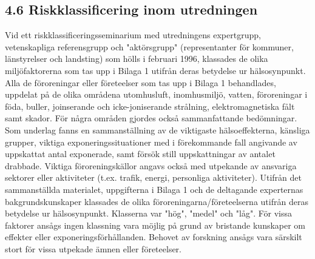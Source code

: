 \subsection*{4.6 Riskklassificering inom utredningen}
Vid ett riskklassificeringsseminarium med utredningens expertgrupp, vetenskapliga referensgrupp och "aktörsgrupp" (representanter för kommuner, länstyrelser och landsting) som hölls i februari 1996, klassades de olika miljöfaktorerna som tas upp i Bilaga 1 utifrån deras betydelse ur hälsosynpunkt.
Alla de föroreningar eller företeelser som tas upp i Bilaga 1 behandlades, uppdelat på de olika områdena utomhusluft, inomhusmiljö, vatten, föroreningar i föda, buller, joinserande och icke-joniserande strålning, elektromagnetiska fålt samt skador. För några områden gjordes också sammanfattande bedömningar. Som underlag fanns en sammanställning av de viktigaste hälsoeffekterna, känsliga grupper, viktiga exponeringssituationer med i förekommande fall angivande av uppskattat antal exponerade, samt försök still uppskattningar av antalet drabbade. Viktiga föroreningskällor angavs också med utpekande av ansvariga sektorer eller aktiviteter (t.ex. trafik, energi, personliga aktiviteter).
Utifrån det sammanställda materialet, uppgifterna i Bilaga 1 och de deltagande experternas bakgrundskunskaper klassades de olika föroreningarna/företeelserna utifrån deras betydelse ur hälsosynpunkt. Klasserna var "hög", "medel" och "låg". För vissa faktorer ansågs ingen klassning vara möjlig på grund av bristande kunskaper om effekter eller exponeringsförhållanden. Behovet av forskning ansågs vara särskilt stort för vissa utpekade ämnen eller företeelser.

